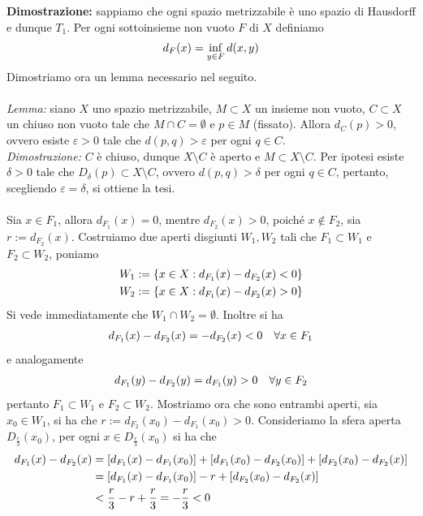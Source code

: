 \documentclass{article}
\begin{document}
\textbf{Dimostrazione:} sappiamo che ogni spazio metrizzabile è uno spazio di Hausdorff e dunque $T_1$. Per ogni sottoinsieme non vuoto $F$ di $X$ definiamo
\begin{gather}
    d_F(x) = \inf_{y \in F} d(x, y) \notag
\end{gather}
Dimostriamo ora un lemma necessario nel seguito. \\ \\
\textit{Lemma:} siano $X$ uno spazio metrizzabile, $M \subset X$ un insieme non vuoto, $C \subset X$ un chiuso non vuoto tale che $M \cap C = \emptyset$ e $p \in M$ (fissato). Allora $d_C(p) > 0$, ovvero esiste $\varepsilon > 0$ tale che $d(p, q) > \varepsilon$ per ogni $q \in C$. \\

\textit{Dimostrazione:} $C$ è chiuso, dunque $X \setminus C$ è aperto e $M \subset X \setminus C$. Per ipotesi esiste $\delta > 0$ tale che $D_\delta (p) \subset X \setminus C$, ovvero $d(p, q) > \delta$ per ogni $q \in C$, pertanto, scegliendo $\varepsilon = \delta$, si ottiene la tesi. \\ \\
Sia $x \in F_1$, allora $d_{F_1}(x) = 0$, mentre $d_{F_2}(x) > 0$, poiché $x \not\in F_2$, sia $r := d_{F_2}(x)$. Costruiamo due aperti disgiunti $W_1, W_2$ tali che $F_1 \subset W_1$ e $F_2 \subset W_2$, poniamo
\begin{gather}
    W_1 := \{ x \in X : d_{F_1}(x) - d_{F_2}(x) < 0 \} \notag \\
    W_2 := \{ x \in X : d_{F_1}(x) - d_{F_2}(x) > 0 \} \notag
\end{gather}
Si vede immediatamente che $W_1 \cap W_2 = \emptyset$. Inoltre si ha
\begin{gather}
    d_{F_1}(x) - d_{F_2}(x) = -d_{F_2}(x) < 0 \quad \forall x \in F_1 \notag
\end{gather}
e analogamente
\begin{gather}
    d_{F_1}(y) - d_{F_2}(y) = d_{F_1}(y) > 0 \quad \forall y \in F_2 \notag
\end{gather}
pertanto $F_1 \subset W_1$ e $F_2 \subset W_2$. Mostriamo ora che sono entrambi aperti, sia $x_0 \in W_1$, si ha che $r := d_{F_2}(x_0) - d_{F_1}(x_0) > 0$. Consideriamo la sfera aperta $D_{\frac{r}{3}}(x_0)$, per ogni $x \in D_{\frac{r}{3}}(x_0)$ si ha che
\begin{align}
    d_{F_1}(x) - d_{F_2}(x) &= [d_{F_1}(x) - d_{F_1}(x_0)] + [d_{F_1}(x_0) - d_{F_2}(x_0)] + [d_{F_2}(x_0) - d_{F_2}(x)] \notag \\
    &= [d_{F_1}(x) - d_{F_1}(x_0)] - r + [d_{F_2}(x_0) - d_{F_2}(x)] \notag \\
    &< \frac{r}{3} - r + \frac{r}{3} = -\frac{r}{3} < 0 \notag
\end{align}
\end{document}

